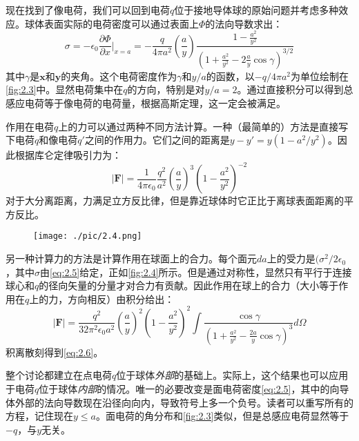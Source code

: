 \documentclass[12pt]{book}
\numberwithin{equation}{chapter}
\numberwithin{figure}{chapter}
\numberwithin{footnote}{page}
\begin{document}
现在找到了像电荷，我们可以回到电荷$q$位于接地导体球的原始问题并考虑多种效应。球体表面实际的电荷密度可以通过表面上$\Phi$的法向导数求出：
\begin{equation}\label{eq:2.5}
    \sigma=-\epsilon_0\frac{\partial \Phi}{\partial x}|_{x=a}=-\frac{q}{4\pi a^2}(\frac{a}{y})\frac{1-\frac{a^2}{y^2}}{(1+\frac{a^2}{y^2}-2\frac{a}{y}\cos \gamma)^{3/2}}
\end{equation}
其中$\gamma$是$\mathbf{x}$和$\mathbf{y}$的夹角。这个电荷密度作为$\gamma$和$y/a$的函数，以$-q/4\pi a^2$为单位绘制在\autoref{fig:2.3}中。显然电荷集中在$q$的方向，特别是对$y/a=2$。通过直接积分可以得到总感应电荷等于像电荷的电荷量，根据高斯定理，这一定会被满足。

作用在电荷$q$上的力可以通过两种不同方法计算。一种（最简单的）方法是直接写下电荷$q$和像电荷$q'$之间的作用力。它们之间的距离是$y-y'=y(1-a^2/y^2)$。因此根据库仑定律吸引力为：
\begin{equation}\label{eq:2.6}
    |\mathbf{F}|=\frac{1}{4\pi\epsilon_0}\frac{q^2}{a^2}(\frac{a}{y})^3(1-\frac{a^2}{y^2})^{-2}
\end{equation}
对于大分离距离，力满足立方反比律，但是靠近球体时它正比于离球表面距离的平方反比。

\begin{figure}[!ht]
    \centering
    \texttt{[image: ./pic/2.4.png]}
    \captionsetup{justification=raggedright, singlelinecheck=false}
    \caption{}
    \label{fig:2.4}
\end{figure}

另一种计算力的方法是计算作用在球面上的合力。每个面元$da$上的受力是$(\sigma^2/2\epsilon_0$，其中$\sigma$由\autoref{eq:2.5}给定，正如\autoref{fig:2.4}所示。但是通过对称性，显然只有平行于连接球心和$q$的径向矢量的分量才对合力有贡献。因此作用在球上的合力（大小等于作用在$q$上的力，方向相反）由积分给出：
\begin{equation}\label{eq:2.7}
    |\mathbf{F}|=\frac{q^2}{32\pi^2\epsilon_0a^2}(\frac{a}{y})^2(1-\frac{a^2}{y^2})^2\int\frac{\cos\gamma}{(1+\frac{a^2}{y^2}-\frac{2a}{y}\cos\gamma)^3}d\Omega
\end{equation}
积离散刻得到\autoref{eq:2.6}。

整个讨论都建立在点电荷$q$位于球体\textit{外部}的基础上。实际上，这个结果也可以应用于电荷$q$位于球体\textit{内部}的情况。唯一的必要改变是面电荷密度\autoref{eq:2.5}，其中的向导体外部的法向导数现在沿径向向内，导致符号上多一个负号。读者可以重写所有的方程，记住现在$y\leq a$。面电荷的角分布和\autoref{fig:2.3}类似，但是总感应电荷显然等于$-q$，与$y$无关。
\end{document}
